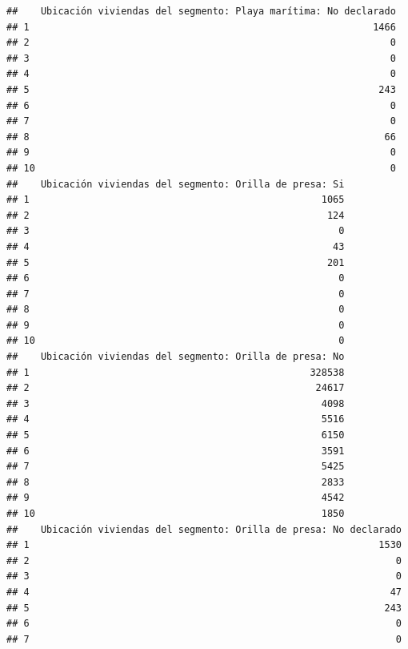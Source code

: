 \documentclass[11pt,]{article}
\begin{document}
\begin{verbatim}
##    Ubicación viviendas del segmento: Playa marítima: No declarado
## 1                                                            1466
## 2                                                               0
## 3                                                               0
## 4                                                               0
## 5                                                             243
## 6                                                               0
## 7                                                               0
## 8                                                              66
## 9                                                               0
## 10                                                              0
##    Ubicación viviendas del segmento: Orilla de presa: Si
## 1                                                   1065
## 2                                                    124
## 3                                                      0
## 4                                                     43
## 5                                                    201
## 6                                                      0
## 7                                                      0
## 8                                                      0
## 9                                                      0
## 10                                                     0
##    Ubicación viviendas del segmento: Orilla de presa: No
## 1                                                 328538
## 2                                                  24617
## 3                                                   4098
## 4                                                   5516
## 5                                                   6150
## 6                                                   3591
## 7                                                   5425
## 8                                                   2833
## 9                                                   4542
## 10                                                  1850
##    Ubicación viviendas del segmento: Orilla de presa: No declarado
## 1                                                             1530
## 2                                                                0
## 3                                                                0
## 4                                                               47
## 5                                                              243
## 6                                                                0
## 7                                                                0

\end{verbatim}
\end{document}
